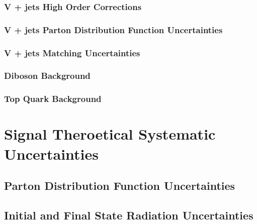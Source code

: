 \documentclass[10pt,twoside,cucitura,classica,english,openany]{toptesi}
\begin{document}


\subsubsection{V + jets High Order Corrections}
\label{sec:v-+-jets}



\subsubsection{V + jets Parton Distribution Function Uncertainties}
\label{sec:v-+-jets-pdf}



\subsubsection{V + jets Matching Uncertainties}
\label{sec:v-+-jets-matching}



\subsubsection{Diboson Background}
\label{sec:diboson-background}



\subsubsection{Top Quark Background}
\label{sec:top-quark-background}



\section{Signal Theroetical Systematic Uncertainties}
\label{sec:ther-syst-uncert}



\subsection{Parton Distribution Function Uncertainties}
\label{sec:pdf-uncertainties}



\subsection{Initial and Final State Radiation Uncertainties}
\label{sec:tune-uncertainties}
\end{document}
